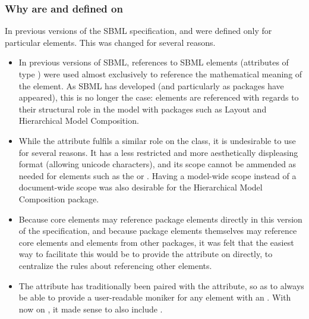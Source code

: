 \begin{blockChanged}
\subsubsection{Why are  and  defined on }
\label{sec:why-on-sbase}

In previous versions of the SBML specification,  and  were defined only for particular elements.  This was changed for several reasons.
\begin{itemize}
  
\item In previous versions of SBML, references to SBML elements (attributes of type ) were used almost exclusively to reference the mathematical meaning of the element.  As SBML has developed (and particularly as packages have appeared), this is no longer the case:  elements are referenced with regards to their structural role in the model with packages such as Layout and Hierarchical Model Composition.

\item While the  attribute fulfils a similar role on the \SBase class, it is undesirable to use for several reasons.  It has a less restricted and more aesthetically displeasing format (allowing unicode characters), and its scope cannot be ammended as needed for elements such as the \UnitDefinition or \LocalParameter.  Having a model-wide scope instead of a document-wide scope was also desirable for the Hierarchical Model Composition package.

\item Because core elements may reference package elements directly in this version of the specification, and because package elements themselves may reference core elements and elements from other packages, it was felt that the easiest way to facilitate this would be to provide the  attribute on \SBase directly, to centralize the rules about referencing other elements.

\item The  attribute has traditionally been paired with the  attribute, so as to always be able to provide a user-readable moniker for any element with an .  With  now on \SBase, it made sense to also include .

\end{itemize}
\end{blockChanged}

